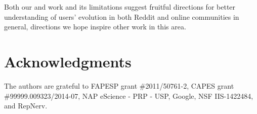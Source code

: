 \documentclass[10pt, oneside, onecolumn]{article}
\begin{document}
Both our and work and its limitations suggest fruitful directions for better understanding of users' evolution in both Reddit and online communities in general, directions we hope inspire other work in this area.  

\section{Acknowledgments}
The authors are grateful to FAPESP grant \#2011/50761-2, CAPES grant \#99999.009323/2014-07, NAP eScience - PRP - USP, Google, NSF IIS-1422484, and RepNerv.



\end{document}
